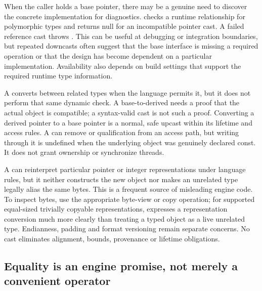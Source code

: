 When the caller holds a base pointer, there may be a genuine need to discover the concrete implementation for diagnostics.  checks a runtime relationship for polymorphic types and returns null for an incompatible pointer cast. A failed reference cast throws . This can be useful at debugging or integration boundaries, but repeated downcasts often suggest that the base interface is missing a required operation or that the design has become dependent on a particular implementation. Availability also depends on build settings that support the required runtime type information.

A  converts between related types when the language permits it, but it does not perform that same dynamic check. A base-to-derived  needs a proof that the actual object is compatible; a syntax-valid cast is not such a proof. Converting a derived pointer to a base pointer is a normal, safe upcast within its lifetime and access rules. A  can remove  or  qualification from an access path, but writing through it is undefined when the underlying object was genuinely declared const. It does not grant ownership or synchronize threads.

A  can reinterpret particular pointer or integer representations under language rules, but it neither constructs the new object nor makes an unrelated type legally alias the same bytes. This is a frequent source of misleading engine code. To inspect bytes, use the appropriate byte-view or copy operation; for supported equal-sized trivially copyable representations,  expresses a representation conversion much more clearly than treating a typed object as a live unrelated type. Endianness, padding and format versioning remain separate concerns. No cast eliminates alignment, bounds, provenance or lifetime obligations.

\subsection{Equality is an engine promise, not merely a convenient operator}\label{01-foundations-i-ch004-equality-is-an-engine-promise-not-merely-a-convenient-operator}

\hypertarget{01-foundations-i-ch004-equality-is-an-engine-promise-not-merely-a-convenient-operator}{}

